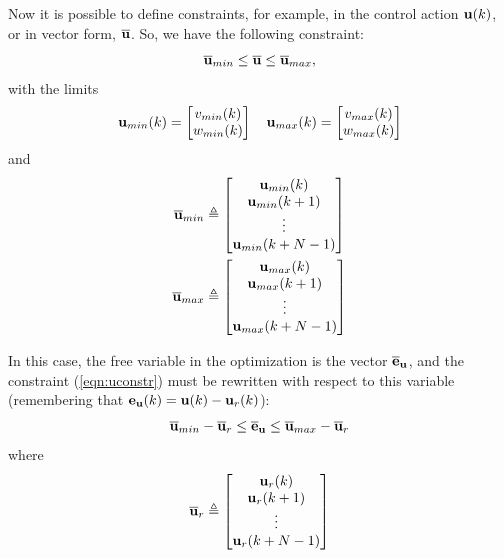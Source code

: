 \documentclass[twocolumn]{IEEEtran} %
\begin{document}
Now it is possible to define constraints, for example, in the control action ${\bf u}(k)$, or in vector form, $\overline {\bf u}$. So, we have the following constraint:
\begin{equation}\label{eqn:uconstr}
	\overline{\bf u}_{min} \leq \overline{\bf u} \leq \overline{\bf u}_{max},
\end{equation}
with the limits 
\begin{equation*}
	{\bf u}_{min}(k) = \begin{bmatrix}
		v_{min}(k) \\ w_{min}(k)
	\end{bmatrix} \quad 
	{\bf u}_{max}(k) = \begin{bmatrix}
		v_{max}(k) \\ w_{max}(k)
	\end{bmatrix}
\end{equation*}
and
\begin{align*}
	\overline{\bf u}_{min} &\triangleq \begin{bmatrix}
		{\bf u}_{min}(k) \\ {\bf u}_{min}(k+1) \\ \vdots \\ {\bf u}_{min}(k+N-1)
	\end{bmatrix} \\
	\overline{\bf u}_{max} &\triangleq \begin{bmatrix}
		{\bf u}_{max}(k) \\ {\bf u}_{max}(k+1) \\ \vdots \\ {\bf u}_{max}(k+N-1)
	\end{bmatrix}
\end{align*}

In this case, the free variable in the optimization is the vector $\overline{\bf e}_{\bf u}$, and the constraint (\ref{eqn:uconstr}) must be rewritten with respect to this variable (remembering that ${\bf e_u}(k)={\bf u}(k)-{\bf u}_r(k)$):
\begin{equation*}
	\overline{\bf u}_{min} - \overline{\bf u}_r \leq \overline{\bf e}_{\bf u} \leq \overline{\bf u}_{max} - \overline{\bf u}_r
\end{equation*}
where
\begin{equation*}
	\overline{\bf u}_r \triangleq \begin{bmatrix}
		{\bf u}_r(k) \\ {\bf u}_r(k+1) \\ \vdots \\ {\bf u}_r(k+N-1)
	\end{bmatrix}
\end{equation*}
\end{document}
